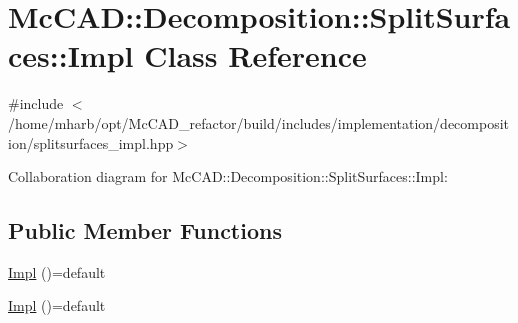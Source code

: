 \hypertarget{classMcCAD_1_1Decomposition_1_1SplitSurfaces_1_1Impl}{}\section{Mc\+C\+AD\+:\+:Decomposition\+:\+:Split\+Surfaces\+:\+:Impl Class Reference}
\label{classMcCAD_1_1Decomposition_1_1SplitSurfaces_1_1Impl}


{\ttfamily \#include $<$/home/mharb/opt/\+Mc\+C\+A\+D\+\_\+refactor/build/includes/implementation/decomposition/splitsurfaces\+\_\+impl.\+hpp$>$}



Collaboration diagram for Mc\+C\+AD\+:\+:Decomposition\+:\+:Split\+Surfaces\+:\+:Impl\+:
\subsection*{Public Member Functions}
\begin{DoxyCompactItemize}
\item 
\hyperlink{classMcCAD_1_1Decomposition_1_1SplitSurfaces_1_1Impl_acb89ab07c562e525c328d7ae41e6a530}{Impl} ()=default
\item 
\hyperlink{classMcCAD_1_1Decomposition_1_1SplitSurfaces_1_1Impl_acb89ab07c562e525c328d7ae41e6a530}{Impl} ()=default
\end{DoxyCompactItemize}
